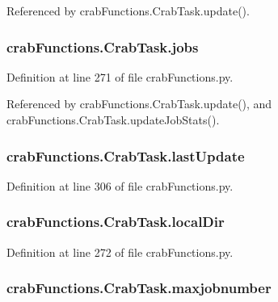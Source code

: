 Referenced by crab\-Functions.\-Crab\-Task.\-update().

\subsubsection[{jobs}]{\setlength{\rightskip}{0pt plus 5cm}crab\-Functions.\-Crab\-Task.\-jobs}\label{classcrabFunctions_1_1CrabTask_a746a99ff156515200f1d0d82aa223262}


Definition at line 271 of file crab\-Functions.\-py.



Referenced by crab\-Functions.\-Crab\-Task.\-update(), and crab\-Functions.\-Crab\-Task.\-update\-Job\-Stats().

\subsubsection[{last\-Update}]{\setlength{\rightskip}{0pt plus 5cm}crab\-Functions.\-Crab\-Task.\-last\-Update}\label{classcrabFunctions_1_1CrabTask_ad4158ae02f09d137a6f2725316f97d29}


Definition at line 306 of file crab\-Functions.\-py.

\subsubsection[{local\-Dir}]{\setlength{\rightskip}{0pt plus 5cm}crab\-Functions.\-Crab\-Task.\-local\-Dir}\label{classcrabFunctions_1_1CrabTask_a09e81135abf744a23819f3919a573206}


Definition at line 272 of file crab\-Functions.\-py.

\subsubsection[{maxjobnumber}]{\setlength{\rightskip}{0pt plus 5cm}crab\-Functions.\-Crab\-Task.\-maxjobnumber}\label{classcrabFunctions_1_1CrabTask_a3bd1d90e824ffd4e94c2670fc788d8f3}


